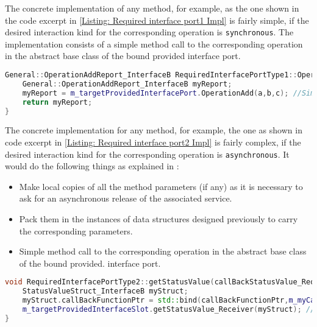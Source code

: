 The concrete implementation of any method, for example, as the one shown in the code excerpt in \cref{Listing: Required interface port1 Impl} is fairly simple, if the desired interaction kind for the corresponding operation is \texttt{synchronous}. The implementation consists of a simple method call to the corresponding operation in the abstract base class of the bound provided interface port.

\begin{Listing}
\begin{lstlisting}[language=C++]
General::OperationAddReport_InterfaceB RequiredInterfacePortType1::OperationAdd (const IntegerType& a,const IntegerType& b,IntegerType& c) {
	General::OperationAddReport_InterfaceB myReport;
	myReport = m_targetProvidedInterfacePort.OperationAdd(a,b,c); //Simple method call
	return myReport;
}
\end{lstlisting}
\caption{Code excerpt from the generated code for requesting service \texttt{OperationAdd} in \texttt{Required\allowbreak InterfacePort\allowbreak Type1}}
\label{Listing: Required interface port1 Impl}
\end{Listing}

The concrete implementation for any method, for example, the one as shown in code excerpt in \cref{Listing: Required interface port2 Impl} is fairly complex, if the desired interaction kind for the corresponding operation is \texttt{asynchronous}. It would do the following things as explained in \cite{CharEvoRAVCodeAr}: 
\begin{itemize}
\item Make local copies of all the method parameters (if any) as it is necessary to ask for an asynchronous release of the associated service.
\item Pack them in the instances of data structures designed previously to carry the corresponding parameters.
\item Simple method call to the corresponding operation in the abstract base class of the bound provided. interface port.
\end{itemize}

\begin{Listing}
\begin{lstlisting}[language=C++]
void RequiredInterfacePortType2::getStatusValue(callBackStatusValue_RequiredInterfacePortType2 callBackFunctionPtr) {
	StatusValueStruct_InterfaceB myStruct; 
	myStruct.callBackFunctionPtr = std::bind(callBackFunctionPtr,m_myCallerInstance,std::placeholder::_1);
	m_targetProvidedInterfaceSlot.getStatusValue_Receiver(myStruct); //Simple method call
}
\end{lstlisting}
\caption{Code excerpt from the generated code for interface attribute \texttt{StatusValue} access in \texttt{Required\allowbreak InterfacePort\allowbreak Type2}}
\label{Listing: Required interface port2 Impl}
\end{Listing}

